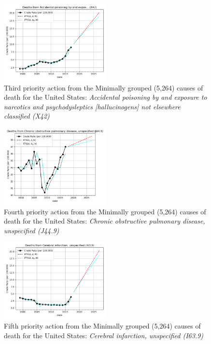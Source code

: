 \documentclass[10pt, a4paper, twocolumn]{IEEEconf}
\begin{document}
\begin{figure}[H]
  \centering
  \includegraphics[width=0.5\textwidth]{results/US_ICD10_MINIMALLY_GROUPED/Accidental_poisoning_by_and_exposure_to_narcotics_and_psychodysleptics_hallucinogens_not_elsewhere_classified_X42_ets.png}
  \caption{Third priority action from the Minimally grouped (5,264) causes of death for the United States: \textit{Accidental poisoning by and exposure to narcotics and psychodysleptics [hallucinogens] not elsewhere classified (X42)}}\label{fig:k7c}
\end{figure}

\begin{figure}[H]
  \centering
  \includegraphics[width=0.5\textwidth]{results/US_ICD10_MINIMALLY_GROUPED/Chronic_obstructive_pulmonary_disease_unspecified_J44_9_ets.png}
  \caption{Fourth priority action from the Minimally grouped (5,264) causes of death for the United States: \textit{Chronic obstructive pulmonary disease, unspecified (J44.9)}}\label{fig:k7d}
\end{figure}

\begin{figure}[H]
  \centering
  \includegraphics[width=0.5\textwidth]{results/US_ICD10_MINIMALLY_GROUPED/Cerebral_infarction_unspecified_I63_9_ets.png}
  \caption{Fifth priority action from the Minimally grouped (5,264) causes of death for the United States: \textit{Cerebral infarction, unspecified (I63.9)}}\label{fig:k7e}
\end{figure}
\end{document}
